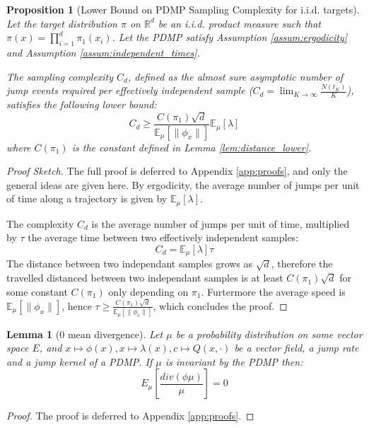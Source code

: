 \documentclass{article}
\newtheorem{proposition}{Proposition}
\newtheorem{lemma}{Lemma}
\begin{document}
\begin{proposition}[Lower Bound on PDMP Sampling Complexity for i.i.d. targets]
    \label{prop:complexity_lower_bound}
    Let the target distribution $\pi$ on $\mathbb{R}^d$ be an i.i.d. product measure such that $\pi(x) = \prod_{i=1}^d \pi_1(x_i)$. Let the PDMP satisfy Assumption \ref{assum:ergodicity} and Assumption \ref{assum:independent_times}. 
    
    The sampling complexity $C_d$, defined as the almost sure asymptotic number of jump events required per effectively independent sample ($C_d = \lim_{K \to \infty} \frac{N(t_K)}{K}$), satisfies the following lower bound:
    \[
        C_d \geq \frac{C(\pi_1)\sqrt{d}}{\mathbb{E}_\mu[\|\phi_x\|]} \mathbb{E}_\mu[\lambda]
    \]
    where $C(\pi_1)$ is the constant defined in Lemma \ref{lem:distance_lower}.
\end{proposition}
\begin{proof}[Proof Sketch]
    The full proof is deferred to Appendix \ref{app:proofs}, and only the general ideas are given here.
    By ergodicity, the average number of jumps per unit of time along a trajectory is given by $\mathbb{E}_\mu[\lambda]$.
    
    The complexity $C_d$ is the average number of jumps per unit of time, multiplied by $\tau$ the average time between two effectively independent samples:
    \[
        C_d = \mathbb{E}_\mu[\lambda] \tau
    \]
    The distance between two independant samples grows as $\sqrt{d}$, therefore the travelled distanced between two independant samples is at least $C(\pi_1)\sqrt{d}$ for some constant $C(\pi_1)$ only depending on $\pi_1$. Furtermore the average speed is $\mathbb{E}_\mu[\|\phi_x\|]$, hence $\tau \geq \frac{C(\pi_1)\sqrt{d}}{\mathbb{E}_\mu[\|\phi_x\|]}$, which concludes the proof.
\end{proof}


\begin{lemma}[0 mean divergence]
    \label{lemma:zero-mean-div}
    Let $\mu$ be a probability distribution on some vector space $E$, and $x\mapsto \phi(x), x \mapsto \lambda(x), c\mapsto Q(x,\cdot)$ be a vector field, a jump rate and a jump kernel of a PDMP. If $\mu$ is invariant by the PDMP then:
    \[
        E_\mu[\frac{div(\phi \mu)}{\mu}] = 0
    \]
\end{lemma}
\begin{proof}
    The proof is deferred to Appendix \ref{app:proofs}.
\end{proof}
\end{document}
